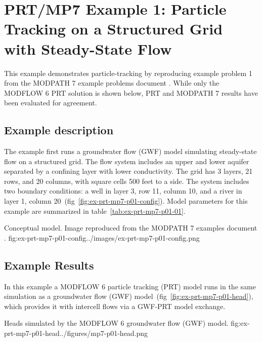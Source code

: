 \section{PRT/MP7 Example 1: Particle Tracking on a Structured Grid with Steady-State Flow}

This example demonstrates particle-tracking by reproducing example problem 1 from the MODPATH 7\citep{pollock2016modpath7} example problems document \citep{modpath7examples}. While only the MODFLOW 6 PRT solution is shown below, PRT and MODPATH 7 results have been evaluated for agreement.

\subsection{Example description}

The example first runs a groundwater flow (GWF) model simulating steady-state flow on a structured grid. The flow system includes an upper and lower aquifer separated by a confining layer with lower conductivity. The grid has 3 layers, 21 rows, and 20 columns, with square cells 500 feet to a side. The system includes two boundary conditions: a well in layer 3, row 11, column 10, and a river in layer 1, column 20~(fig~\ref{fig:ex-prt-mp7-p01-config}). Model parameters for this example are summarized in table~\ref{tab:ex-prt-mp7-p01-01}.

\begin{StandardFigure}{
    Conceptual model. Image reproduced from the MODPATH 7 examples document \citep{modpath7examples}.
    }{fig:ex-prt-mp7-p01-config}{../images/ex-prt-mp7-p01-config.png}
\end{StandardFigure}



\subsection{Example Results}

In this example a MODFLOW 6 particle tracking (PRT) model runs in the same simulation as a groundwater flow (GWF) model~(fig~\ref{fig:ex-prt-mp7-p01-head}), which provides it with intercell flows via a GWF-PRT model exchange.

\begin{StandardFigure}{
    Heads simulated by the MODFLOW 6 groundwater flow (GWF) model.
    }{fig:ex-prt-mp7-p01-head}{../figures/mp7-p01-head.png}
\end{StandardFigure}

